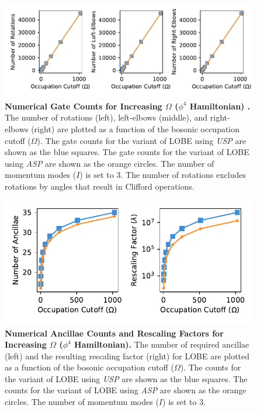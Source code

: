 \begin{figure}
    \centering
    \includegraphics[width=16cm]{figures/phi4_hamiltonian_gates_vs_omega.pdf}
    \caption{
        \textbf{Numerical Gate Counts for Increasing $\Omega$ ($\phi^4$ Hamiltonian) .}
        The number of rotations (left), left-elbows (middle), and right-elbows (right) are plotted as a function of the bosonic occupation cutoff ($\Omega$).
        The gate counts for the variant of LOBE using \textit{USP} are shown as the blue squares.
        The gate counts for the variant of LOBE using \textit{ASP} are shown as the orange circles.
        The number of momentum modes ($I$) is set to $3$.
        The number of rotations excludes rotations by angles that result in Clifford operations.
    }
    \label{fig:phi4_hamiltonian_gates_vs_omega}
\end{figure}
\begin{figure}
    \centering
    \includegraphics[width=12cm]{figures/phi4_hamiltonian_qubits_and_rescaling_vs_omega.pdf}
    \caption{
        \textbf{Numerical Ancillae Counts and Rescaling Factors for Increasing $\Omega$ ($\phi^4$ Hamiltonian).}
        The number of required ancillae (left) and the resulting rescaling factor (right) for LOBE are plotted as a function of the bosonic occupation cutoff ($\Omega$).
        The counts for the variant of LOBE using \textit{USP} are shown as the blue squares.
        The counts for the variant of LOBE using \textit{ASP} are shown as the orange circles.
        The number of momentum modes ($I$) is set to $3$.
    }
    \label{fig:phi4_hamiltonian_qubits_and_rescaling_vs_omega}
\end{figure}